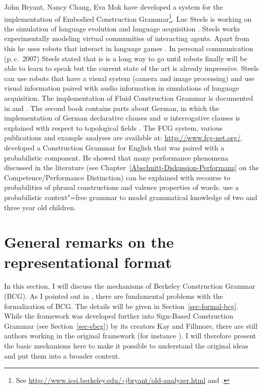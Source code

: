 John Bryant, Nancy Chang, Eva Mok
have developed a system for the implementation of Embodied Construction Grammar\footnote{
  See \url{http://www.icsi.berkeley.edu/~jbryant/old-analyzer.html} and .
}.
Luc Steels is working on the simulation of language evolution and language acquisition
\citep{Steels2003a}. Steels works experimentally modeling virtual communities of interacting
agents. Apart from this he uses robots that interact in language games \citep{Steels2015a-u}.
In personal communication (p.\,c.\ 2007) %
Steels stated that is is a long way to go until robots finally will be able to learn to speak but the
current state of the art is already impressive. Steels can use robots that have a visual system
(camera and image processing) and use visual information paired with audio information in
simulations of language acquisition. The implementation of Fluid Construction Grammar is documented in
 and . The second book contains parts about
German, in which the implementation of German declarative clauses and \emph{w} interrogative clauses
is explained with respect to topological fields \citep{Micelli2012a}. The FCG system, various
publications and example analyses are available at: \url{http://www.fcg-net.org/}.
\citet{Jurafsky96a} developed a Construction Grammar for English that was paired with a
probabilistic component. He showed that many performance phenomena
discussed in the literature (see Chapter~\ref{Abschnitt-Diskussion-Performanz} on
the Competence/Performance Distinction) can be explained with recourse to probabilities of phrasal
constructions and valence properties of words.
\citet*{BLT2009a} use a probabilistic context"=free grammar to model grammatical knowledge of two and three year old children.


\section{General remarks on the representational format}

In this section, I will discuss the mechanisms of Berkeley Construction Grammar (BCG). As I pointed out in
, there are fundamental problems with the formalization of BCG. The details will
be given in Section~\ref{sec-formal-bcg}. While the framework was developed further into Sign-Based Construction Grammar (see Section~\ref{sec-sbcg}) by its creators Kay
and Fillmore, there are still authors working in the original framework (for instance \citealp{Fried2013a-u}). I will therefore present the basic mechanisms here to make it possible
to understand the original ideas and put them into a broader context.

